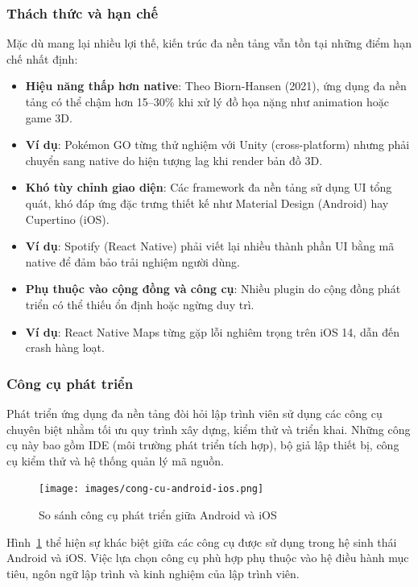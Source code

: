 \subsubsection{Thách thức và hạn chế}
\begin{flushleft}
    \hspace*{0.8cm}Mặc dù mang lại nhiều lợi thế, kiến trúc đa nền tảng vẫn tồn tại những điểm hạn chế nhất định:
    \setlength{\leftmargini}{1.5cm}
    \begin{itemize}
        \item \textbf{Hiệu năng thấp hơn native}: Theo Biorn-Hansen (2021), ứng dụng đa nền tảng có thể chậm hơn 15–30\% khi xử lý đồ họa nặng như animation hoặc game 3D.
        \item \textbf{Ví dụ}: Pokémon GO từng thử nghiệm với Unity (cross-platform) nhưng phải chuyển sang native do hiện tượng lag khi render bản đồ 3D.
        \item \textbf{Khó tùy chỉnh giao diện}: Các framework đa nền tảng sử dụng UI tổng quát, khó đáp ứng đặc trưng thiết kế như Material Design (Android) hay Cupertino (iOS).
        \item \textbf{Ví dụ}: Spotify (React Native) phải viết lại nhiều thành phần UI bằng mã native để đảm bảo trải nghiệm người dùng.
        \item \textbf{Phụ thuộc vào cộng đồng và công cụ}: Nhiều plugin do cộng đồng phát triển có thể thiếu ổn định hoặc ngừng duy trì.
        \item \textbf{Ví dụ}: React Native Maps từng gặp lỗi nghiêm trọng trên iOS 14, dẫn đến crash hàng loạt.
    \end{itemize}
\end{flushleft}

\subsubsection{Công cụ phát triển}
\begin{flushleft}
  \hspace*{0.8cm}Phát triển ứng dụng đa nền tảng đòi hỏi lập trình viên sử dụng các công cụ chuyên biệt nhằm tối ưu quy trình xây dựng, kiểm thử và triển khai. Những công cụ này bao gồm IDE (môi trường phát triển tích hợp), bộ giả lập thiết bị, công cụ kiểm thử và hệ thống quản lý mã nguồn.

  \begin{figure}[H]
    \centering
    \texttt{[image: images/cong-cu-android-ios.png]}
    \caption{So sánh công cụ phát triển giữa Android và iOS}
    \label{fig:android_ios_tools}
  \end{figure}

  \hspace*{0.8cm}Hình~\ref{fig:android_ios_tools} thể hiện sự khác biệt giữa các công cụ được sử dụng trong hệ sinh thái Android và iOS. Việc lựa chọn công cụ phù hợp phụ thuộc vào hệ điều hành mục tiêu, ngôn ngữ lập trình và kinh nghiệm của lập trình viên.
\end{flushleft}


